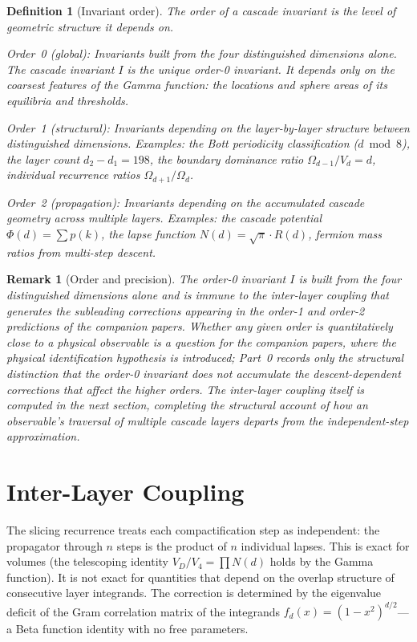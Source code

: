 \documentclass[11pt,a4paper]{article}
\newtheorem{definition}[theorem]{Definition}
\newtheorem{remark}[theorem]{Remark}
\begin{document}
\begin{definition}[Invariant order]\label{def:order}
The \emph{order} of a cascade invariant is the level of geometric
structure it depends on.

\emph{Order~0 (global):} Invariants built from the four distinguished
dimensions alone. The cascade invariant $I$ is the unique order-0
invariant. It depends only on the coarsest features of the Gamma
function: the locations and sphere areas of its equilibria and thresholds.

\emph{Order~1 (structural):} Invariants depending on the layer-by-layer
structure between distinguished dimensions. Examples: the Bott periodicity
classification ($d\bmod 8$), the layer count $d_2 - d_1 = 198$, the
boundary dominance ratio $\Omega_{d-1}/V_d = d$, individual recurrence
ratios $\Omega_{d+1}/\Omega_d$.

\emph{Order~2 (propagation):} Invariants depending on the accumulated
cascade geometry across multiple layers. Examples: the cascade potential
$\Phi(d) = \sum p(k)$, the lapse function $N(d) = \sqrt{\pi}\cdot R(d)$,
fermion mass ratios from multi-step descent.
\end{definition}

\begin{remark}[Order and precision]
The order-0 invariant $I$ is built from the four distinguished dimensions
alone and is immune to the inter-layer coupling that generates the
subleading corrections appearing in the order-1 and order-2 predictions
of the companion papers. Whether any given order is quantitatively close
to a physical observable is a question for the companion papers, where
the physical identification hypothesis is introduced; Part~0 records only
the structural distinction that the order-0 invariant does not accumulate
the descent-dependent corrections that affect the higher orders. The
inter-layer coupling itself is computed in the next section, completing
the structural account of how an observable's traversal of multiple
cascade layers departs from the independent-step approximation.
\end{remark}

\section{Inter-Layer Coupling}\label{sec:inter-layer-coupling}

The slicing recurrence treats each compactification step as independent: the propagator through $n$ steps is the product of $n$ individual lapses. This is exact for volumes (the telescoping identity $V_D/V_4 = \prod N(d)$ holds by the Gamma function). It is not exact for quantities that depend on the overlap structure of consecutive layer integrands. The correction is determined by the eigenvalue deficit of the Gram correlation matrix of the integrands $f_d(x) = (1 - x^2)^{d/2}$---a Beta function identity with no free parameters.
\end{document}
